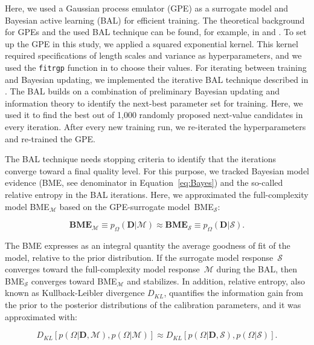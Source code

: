 \documentclass[draft,linenumbers,onecolumn]{agujournal2019} %
\begin{document}
Here, we used a Gaussian process emulator (GPE) as a surrogate model and Bayesian active learning (BAL) for efficient training. The theoretical background for GPEs and the used BAL technique can be found, for example, in  and . To set up the GPE in this study, we applied a squared exponential kernel. This kernel required specifications of length scales and variance as hyperparameters, and we used the \texttt{fitrgp} function in  to choose their values. For iterating between training and Bayesian updating, we implemented the iterative BAL technique described in . The BAL builds on a combination of preliminary Bayesian updating and information theory \cite{oladyshkin_connection_2019} to identify the next-best parameter set for training. Here, we used it to find the best out of 1,000 randomly proposed next-value candidates in every iteration. After every new training run, we re-iterated the hyperparameters and re-trained the GPE.

The BAL technique needs stopping criteria to identify that the iterations converge toward a final quality level. For this purpose, we tracked Bayesian model evidence (BME, see denominator in Equation~\ref{eq:Bayes}) and the so-called relative entropy in the BAL iterations. Here, we approximated the full-complexity model BME$_{\mathcal{M}}$ based on the GPE-surrogate model~BME$_{\mathcal{S}}$:

\begin{equation}
	\textbf{BME}_{\mathcal{M}} \equiv p_{\Omega}(\textbf{D} \vert {\mathcal{M}}) \approx \textbf{BME}_{\mathcal{S}} \equiv p_{\Omega}(\textbf{D} \vert {\mathcal{S}}) .
	\label{eq:bal_bme}
\end{equation}

The BME expresses as an integral quantity the average goodness of fit of the model, relative to the prior distribution. If the surrogate model response~$\mathcal{S}$ converges toward the full-complexity model response~$\mathcal{M}$ during the BAL, then BME$_{\mathcal{S}}$ converges toward BME$_{\mathcal{M}}$ and stabilizes. In addition, relative entropy, also known as Kullback-Leibler divergence $D_{KL}$, quantifies the information gain from the prior to the posterior distributions of the calibration parameters, and it was approximated with:

\begin{equation}
	\label{eq:re}
	D_{KL} [p(\Omega \vert \textbf{D},\mathcal{M}), p(\Omega \vert \mathcal{M})] \approx D_{KL} [p(\Omega \vert \textbf{D},\mathcal{S}), p(\Omega \vert \mathcal{S})] .
\end{equation}
\end{document}
